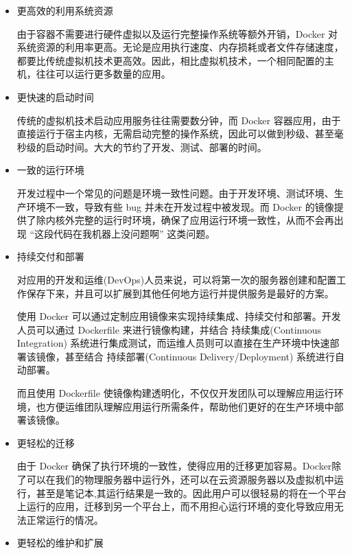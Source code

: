 \begin{itemize}
\item 更高效的利用系统资源

由于容器不需要进行硬件虚拟以及运行完整操作系统等额外开销，Docker 对系统资源的利用率更高。无论是应用执行速度、内存损耗或者文件存储速度，都要比传统虚拟机技术更高效。因此，相比虚拟机技术，一个相同配置的主机，往往可以运行更多数量的应用。
\item 更快速的启动时间

传统的虚拟机技术启动应用服务往往需要数分钟，而 Docker 容器应用，由于直接运行于宿主内核，无需启动完整的操作系统，因此可以做到秒级、甚至毫秒级的启动时间。大大的节约了开发、测试、部署的时间。
\item 一致的运行环境

开发过程中一个常见的问题是环境一致性问题。由于开发环境、测试环境、生产环境不一致，导致有些 bug 并未在开发过程中被发现。而 Docker 的镜像提供了除内核外完整的运行时环境，确保了应用运行环境一致性，从而不会再出现 “这段代码在我机器上没问题啊” 这类问题。
\item 持续交付和部署

对应用的开发和运维(DevOps)人员来说，可以将第一次的服务器创建和配置工作保存下来，并且可以扩展到其他任何地方运行并提供服务是最好的方案。

使用 Docker 可以通过定制应用镜像来实现持续集成、持续交付和部署。开发人员可以通过 Dockerfile 来进行镜像构建，并结合 持续集成(Continuous Integration) 系统进行集成测试，而运维人员则可以直接在生产环境中快速部署该镜像，甚至结合 持续部署(Continuous Delivery/Deployment) 系统进行自动部署。

而且使用 Dockerfile 使镜像构建透明化，不仅仅开发团队可以理解应用运行环境，也方便运维团队理解应用运行所需条件，帮助他们更好的在生产环境中部署该镜像。
\item 更轻松的迁移

由于 Docker 确保了执行环境的一致性，使得应用的迁移更加容易。Docker除了可以在我们的物理服务器中运行外，还可以在云资源服务器以及虚拟机中运行，甚至是笔记本,其运行结果是一致的。因此用户可以很轻易的将在一个平台上运行的应用，迁移到另一个平台上，而不用担心运行环境的变化导致应用无法正常运行的情况。
\item 更轻松的维护和扩展


\end{itemize}
